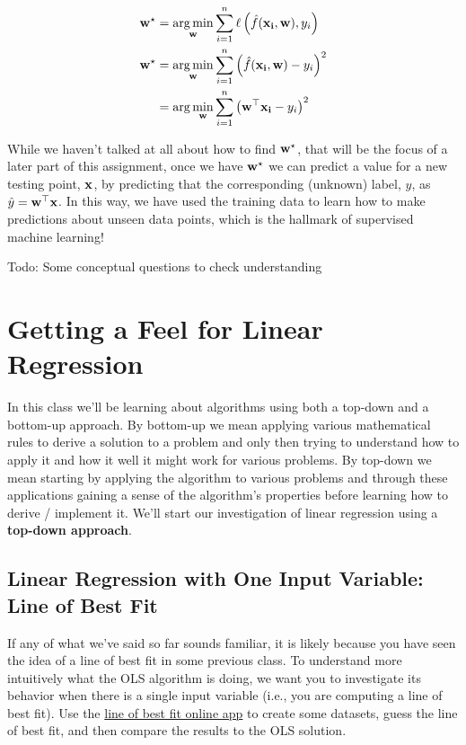 \documentclass[assignment01_Solutions]{subfiles}
\begin{document}
\begin{align}
\mathbf{w}^\star &= \operatorname*{arg\,min}_{\mathbf{w}} \sum_{i=1}^n \ell \left ( \hat{f}(\mathbf{x_i}, \mathbf{w}) , y_i \right) \\
\mathbf{w}^\star &= \operatorname*{arg\,min}_{\mathbf{w}} \sum_{i=1}^n \left ( \hat{f}(\mathbf{x_i}, \mathbf{w}) - y_i \right)^2 \\
&= \arg\min_{\mathbf{w}} \sum_{i=1}^n \left ( \mathbf{w}^\top \mathbf{x_i} - y_i \right)^2
\end{align}

While we haven't talked at all about how to find $\mathbf{w}^\star$, that will be the focus of a later part of this assignment, once we have $\mathbf{w}^\star$ we can predict a value for a new testing point, $\mathbf{x}$, by predicting that the corresponding (unknown) label, $y$, as $\hat{y} = \mathbf{w}^\top \mathbf{x}$.  In this way, we have used the training data to learn how to make predictions about unseen data points, which is the hallmark of supervised machine learning!

\begin{exercise}
Todo: Some conceptual questions to check understanding
\end{exercise}

\section{Getting a Feel for Linear Regression}
In this class we'll be learning about algorithms using both a top-down and a bottom-up approach.  By bottom-up we mean applying various mathematical rules to derive a solution to a problem and only then trying to understand how to apply it and how it well it might work for various problems.  By top-down we mean starting by applying the algorithm to various problems and through these applications gaining a sense of the algorithm's properties before learning how to derive / implement it.  We'll start our investigation of linear regression using a \textbf{top-down approach}.


\subsection{Linear Regression with One Input Variable: Line of Best Fit}

If any of what we've said so far sounds familiar, it is likely because you have seen the idea of a line of best fit in some previous class.  To understand more intuitively what the OLS algorithm is doing, we want you to investigate its behavior when there is a single input variable (i.e., you are computing a line of best fit).  Use the \href{http://www.shodor.org/interactivate/activities/Regression/}{line of best fit online app} to create some datasets, guess the line of best fit, and then compare the results to the OLS solution.
\end{document}
